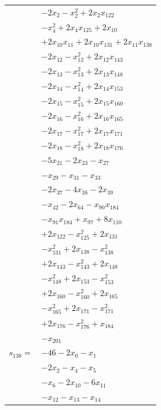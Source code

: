 \begin{longtable}{@{}r@{\;}l@{}}
 & \(\displaystyle -2x_{2} -x_{2}^{2} +2x_{2}x_{122}\) \\
 & \(\displaystyle -x_{4}^{2} +2x_{4}x_{125} +2x_{10}\) \\
 & \(\displaystyle +2x_{10}x_{11} +2x_{10}x_{131} +2x_{11}x_{138}\) \\
 & \(\displaystyle -2x_{12} -x_{12}^{2} +2x_{12}x_{143}\) \\
 & \(\displaystyle -2x_{13} -x_{13}^{2} +2x_{13}x_{148}\) \\
 & \(\displaystyle -2x_{14} -x_{14}^{2} +2x_{14}x_{153}\) \\
 & \(\displaystyle -2x_{15} -x_{15}^{2} +2x_{15}x_{160}\) \\
 & \(\displaystyle -2x_{16} -x_{16}^{2} +2x_{16}x_{165}\) \\
 & \(\displaystyle -2x_{17} -x_{17}^{2} +2x_{17}x_{171}\) \\
 & \(\displaystyle -2x_{18} -x_{18}^{2} +2x_{18}x_{176}\) \\
 & \(\displaystyle -5x_{21} -2x_{23} -x_{27}\) \\
 & \(\displaystyle -x_{29} -x_{31} -x_{33}\) \\
 & \(\displaystyle -2x_{37} -4x_{38} -2x_{39}\) \\
 & \(\displaystyle -x_{42} -2x_{64} -x_{90}x_{184}\) \\
 & \(\displaystyle -x_{91}x_{184} +x_{97} +8x_{110}\) \\
 & \(\displaystyle +2x_{122} -x_{125}^{2} +2x_{131}\) \\
 & \(\displaystyle -x_{131}^{2} +2x_{138} -x_{138}^{2}\) \\
 & \(\displaystyle +2x_{143} -x_{143}^{2} +2x_{148}\) \\
 & \(\displaystyle -x_{148}^{2} +2x_{153} -x_{153}^{2}\) \\
 & \(\displaystyle +2x_{160} -x_{160}^{2} +2x_{165}\) \\
 & \(\displaystyle -x_{165}^{2} +2x_{171} -x_{171}^{2}\) \\
 & \(\displaystyle +2x_{176} -x_{176}^{2} +x_{184}\) \\
 & \(\displaystyle -x_{201}\) \\[3pt]
\(s_{138}=\) & \(\displaystyle -46 -2x_{0} -x_{1}\) \\
 & \(\displaystyle -2x_{2} -x_{4} -x_{5}\) \\
 & \(\displaystyle -x_{6} -2x_{10} -6x_{11}\) \\
 & \(\displaystyle -x_{12} -x_{13} -x_{14}\) \\

\end{longtable}

